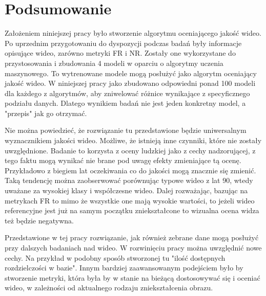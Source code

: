\chapter{Podsumowanie}


Założeniem niniejszej pracy było stworzenie algorytmu oceniającego jakość wideo. Po uprzednim przygotowaniu do dyspozycji podczas badań były  informacje opisujące wideo, zarówno metryki FR i NR. Zostały one wykorzystane do przystosowania i zbudowania 4 modeli w oparciu o algorytmy uczenia maszynowego. 
To wytrenowane modele mogą posłużyć jako algorytm oceniający jakość wideo. W niniejszej pracy jako zbudowano odpowiedni ponad 100 modeli dla każdego z algorytmów, aby zniwelować  różnice wynikające z specyficznego podziału danych. Dlatego wynikiem badań nie jest  jeden konkretny model, a "przepis" jak go otrzymać.\par

Nie można powiedzieć, że rozwiązanie tu przedstawione będzie uniwersalnym wyznacznikiem jakości wideo. Możliwe, że istnieją inne czynniki, które nie zostały uwzględnione. Badanie to korzysta z oceny ludzkiej jako z cechy nadzorującej, z tego faktu mogą wynikać nie brane pod uwagę efekty zmieniające tą ocenę. Przykładowo z biegiem lat oczekiwania co do jakości mogą znacznie się zmienić. Taką tendencję można zaobserwować porównując typowe wideo z lat 90, wtedy uważane za wysokiej klasy i współczesne wideo. Dalej rozważając,  bazując na metrykach FR to mimo że wszystkie one mają wysokie wartości, to jeżeli wideo referencyjne jest już na samym początku zniekształcone to wizualna ocena widza też będzie negatywna. \par

Przedstawione w tej pracy rozwiązanie, jak również zebrane dane mogą posłużyć przy dalszych badaniach nad wideo. W rozwinięciu pracy  można uwzględnić nowe cechy. Na przykład w podobny sposób stworzonej tu "ilość dostępnych rozdzielczości w bazie". Innym bardziej zaawansowanym podejściem było by stworzenie metryki, która była by  w stanie na bieżącą dostosowywać się i oceniać wideo, w zależności od aktualnego rodzaju zniekształcenia obrazu.\par


\label{cha:pierwszyDokument}









